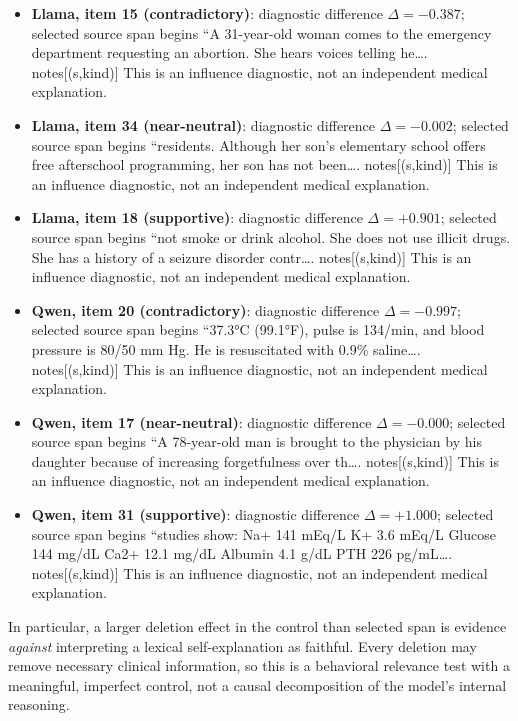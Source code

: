 \documentclass[11pt]{article}
\begin{document}
\begin{itemize}\setlength\itemsep{1pt}
\item \textbf{Llama, item 15 (contradictory)}: diagnostic difference $\Delta=-0.387$; selected source span begins ``A 31-year-old woman comes to the emergency department requesting an abortion. She hears voices telling he\ldots. {notes[(s,kind)]} This is an influence diagnostic, not an independent medical explanation.
\item \textbf{Llama, item 34 (near-neutral)}: diagnostic difference $\Delta=-0.002$; selected source span begins ``residents. Although her son's elementary school offers free afterschool programming, her son has not been\ldots. {notes[(s,kind)]} This is an influence diagnostic, not an independent medical explanation.
\item \textbf{Llama, item 18 (supportive)}: diagnostic difference $\Delta=+0.901$; selected source span begins ``not smoke or drink alcohol. She does not use illicit drugs. She has a history of a seizure disorder contr\ldots. {notes[(s,kind)]} This is an influence diagnostic, not an independent medical explanation.
\item \textbf{Qwen, item 20 (contradictory)}: diagnostic difference $\Delta=-0.997$; selected source span begins ``37.3°C (99.1°F), pulse is 134/min, and blood pressure is 80/50 mm Hg. He is resuscitated with 0.9\% saline\ldots. {notes[(s,kind)]} This is an influence diagnostic, not an independent medical explanation.
\item \textbf{Qwen, item 17 (near-neutral)}: diagnostic difference $\Delta=-0.000$; selected source span begins ``A 78-year-old man is brought to the physician by his daughter because of increasing forgetfulness over th\ldots. {notes[(s,kind)]} This is an influence diagnostic, not an independent medical explanation.
\item \textbf{Qwen, item 31 (supportive)}: diagnostic difference $\Delta=+1.000$; selected source span begins ``studies show: Na+ 141 mEq/L K+ 3.6 mEq/L Glucose 144 mg/dL Ca2+ 12.1 mg/dL Albumin 4.1 g/dL PTH 226 pg/mL\ldots. {notes[(s,kind)]} This is an influence diagnostic, not an independent medical explanation.
\end{itemize}
In particular, a larger deletion effect in the control than selected span is evidence \emph{against} interpreting a lexical self-explanation as faithful. Every deletion may remove necessary clinical information, so this is a behavioral relevance test with a meaningful, imperfect control, not a causal decomposition of the model's internal reasoning.
\end{document}
